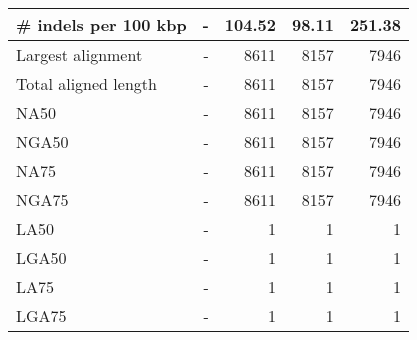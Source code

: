 \documentclass[12pt,a4paper]{article}
\begin{document}
\begin{table}[ht]
\begin{center}
\begin{tabular}{|l*{4}{|r}|}
\# indels per 100 kbp & - & 104.52 & 98.11 & 251.38 \\ \hline
Largest alignment & - & 8611 & 8157 & 7946 \\ \hline
Total aligned length & - & 8611 & 8157 & 7946 \\ \hline
NA50 & - & 8611 & 8157 & 7946 \\ \hline
NGA50 & - & 8611 & 8157 & 7946 \\ \hline
NA75 & - & 8611 & 8157 & 7946 \\ \hline
NGA75 & - & 8611 & 8157 & 7946 \\ \hline
LA50 & - & 1 & 1 & 1 \\ \hline
LGA50 & - & 1 & 1 & 1 \\ \hline
LA75 & - & 1 & 1 & 1 \\ \hline
LGA75 & - & 1 & 1 & 1 \\ \hline
\end{tabular}
\end{center}
\end{table}
\end{document}
